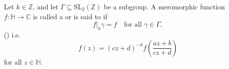 \begin{definition} \label{definition:weakly_modular_form_with_respect_to_a_subgroup_of_SL_2_Z}
Let $k \in \mathbb{Z}$, and let $\Gamma \subseteq \mathrm{SL}_2(\mathbb{Z})$ be a subgroup. A meromorphic function $f:\mathbb{H}\to\mathbb{C}$ is called a  or is said to  if
$$f|_k\gamma = f \quad \text{for all } \gamma \in \Gamma,$$
() i.e.
$$f(z) = (cz+d)^{-k} f\left( \frac{az+b}{cz+d} \right)$$
for all $z \in \mathbb{H}$.
\end{definition}